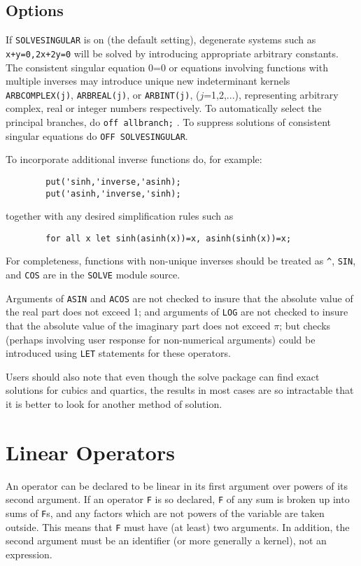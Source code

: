 \subsection{Options}

If {\tt SOLVESINGULAR}  is on (the default setting),
degenerate systems such as {\tt x+y=0,2x+2y=0} will be solved by
introducing appropriate arbitrary constants.
The consistent singular equation 0=0 or equations involving functions with
multiple inverses may introduce unique new indeterminant kernels
{\tt ARBCOMPLEX(j)}, {\tt ARBREAL(j)}, or {\tt ARBINT(j)}, ($j$=1,2,...),
representing arbitrary complex, real or integer numbers respectively.  To
automatically select the principal branches, do {\tt off allbranch;} .
To suppress solutions of consistent singular equations do
{\tt OFF SOLVESINGULAR}.

To incorporate additional inverse functions do, for example:
\begin{verbatim}
        put('sinh,'inverse,'asinh);
        put('asinh,'inverse,'sinh);
\end{verbatim}
together with any desired simplification rules such as
\begin{verbatim}
        for all x let sinh(asinh(x))=x, asinh(sinh(x))=x;
\end{verbatim}
For completeness, functions with non-unique inverses should be treated as
{\tt \^{ }}, {\tt SIN}, and {\tt COS} are in the {\tt SOLVE}
 module source.

Arguments of {\tt ASIN} and {\tt ACOS} are not checked to insure that the
absolute value of the real part does not exceed 1; and arguments of
{\tt LOG} are not checked to insure that the absolute value of the imaginary
part does not exceed $\pi$; but checks (perhaps involving user response
for non-numerical arguments) could be introduced using
{\tt LET}  statements for these operators.

Users should also note that even though the solve package can find exact
solutions for cubics and quartics, the results in most cases are so
intractable that it is better to look for another method of solution.

\section{Linear Operators}
An operator can be declared to be linear in its first argument over powers
of its second argument.  If an operator {\tt F} is so declared, {\tt F} of
any sum is broken up into sums of {\tt F}s, and any factors which are not
powers of the variable are taken outside.  This means that {\tt F} must
have (at least) two arguments.  In addition, the second argument must be
an identifier (or more generally a kernel), not an expression.

